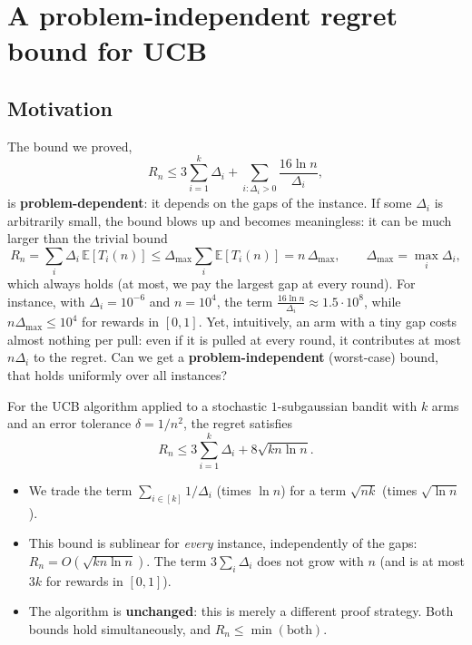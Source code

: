 \section{A problem-independent regret bound for UCB}

\subsection{Motivation}

The bound we proved,
\[
R_n \leq 3\sum_{i=1}^k \Delta_i + \sum_{i:\Delta_i > 0} \frac{16\ln n}{\Delta_i},
\]
is \textbf{problem-dependent}: it depends on the gaps of the instance. If some $\Delta_i$ is arbitrarily small, the bound blows up and becomes meaningless: it can be much larger than the trivial bound
\[
R_n = \sum_i \Delta_i\,\mathbb{E}[T_i(n)] \leq \Delta_{\max} \sum_i \mathbb{E}[T_i(n)] = n\,\Delta_{\max}, \qquad \Delta_{\max} = \max_i \Delta_i,
\]
which always holds (at most, we pay the largest gap at every round). For instance, with $\Delta_i = 10^{-6}$ and $n = 10^4$, the term $\frac{16\ln n}{\Delta_i} \approx 1.5 \cdot 10^8$, while $n\Delta_{\max} \leq 10^4$ for rewards in $[0,1]$. Yet, intuitively, an arm with a tiny gap costs almost nothing per pull: even if it is pulled at every round, it contributes at most $n\Delta_i$ to the regret. Can we get a \textbf{problem-independent} (worst-case) bound, that holds uniformly over all instances?

\begin{theorem}
For the UCB algorithm applied to a stochastic $1$-subgaussian bandit with $k$ arms and an error tolerance $\delta = 1/n^2$, the regret satisfies
\[
R_n \leq 3\sum_{i=1}^k \Delta_i + 8\sqrt{kn\ln n}.
\]
\end{theorem}

\begin{remark}
\begin{itemize}
    \item We trade the term $\sum_{i\in[k]} 1/\Delta_i$ (times $\ln n$) for a term $\sqrt{nk}$ (times $\sqrt{\ln n}$).
    \item This bound is sublinear for \emph{every} instance, independently of the gaps: $R_n = O(\sqrt{kn\ln n})$. The term $3\sum_i \Delta_i$ does not grow with $n$ (and is at most $3k$ for rewards in $[0,1]$).
    \item The algorithm is \textbf{unchanged}: this is merely a different proof strategy. Both bounds hold simultaneously, and $R_n \leq \min(\text{both})$.
\end{itemize}
\end{remark}

